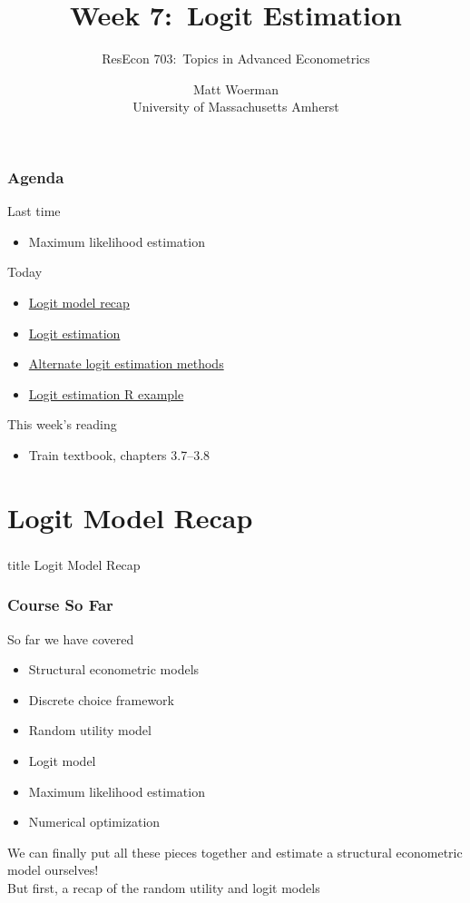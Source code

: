\documentclass{beamer}\usepackage[]{graphicx}\usepackage[]{color}
\title[Week 7:\ Logit Estimation]{Week 7:\ Logit Estimation}
\author[ResEcon 703:\ Advanced Econometrics]{ResEcon 703:\ Topics in Advanced Econometrics}
\date{Matt Woerman\\University of Massachusetts Amherst}
\begin{document}
{ 
\begin{frame}[noframenumbering]
    \titlepage
\end{frame}
}

\begin{frame}\frametitle{Agenda}
    Last time
    \begin{itemize}
        \item Maximum likelihood estimation
    \end{itemize}
    \vspace{3ex}
    Today
    \begin{itemize}
    	\item \hyperlink{page.\getpagerefnumber{recap}}{Logit model recap}
        \item \hyperlink{page.\getpagerefnumber{estim}}{Logit estimation}
        \item \hyperlink{page.\getpagerefnumber{alt}}{Alternate logit estimation methods}
        \item \hyperlink{page.\getpagerefnumber{example}}{Logit estimation R example}
    \end{itemize}
    \vspace{3ex}
    This week's reading
    \begin{itemize}
        \item Train textbook, chapters 3.7--3.8
    \end{itemize}
\end{frame}

\section{Logit Model Recap}
\label{recap}
\begin{frame}\frametitle{}
    \vfill
    \centering
    \begin{beamercolorbox}[center]{title}
        \Large Logit Model Recap
    \end{beamercolorbox}
    \vfill
\end{frame}

\begin{frame}\frametitle{Course So Far}
    So far we have covered
    \begin{itemize}
    	\item Structural econometric models
    	\item Discrete choice framework
    	\item Random utility model
    	\item Logit model
    	\item Maximum likelihood estimation
    	\item Numerical optimization
    \end{itemize}
    \vspace{3ex}
    We can finally put all these pieces together and estimate a structural econometric model ourselves! \\
    \vspace{3ex}
    But first, a recap of the random utility and logit models
\end{frame}
\end{document}
